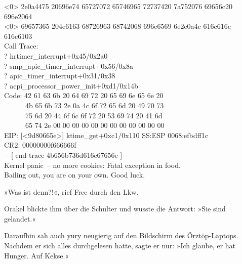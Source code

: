 \begin{tiny}
\begin{ttfamily}
\noindent [376730.313667] \textless{}0\textgreater{} 2e0a4475 20696e74 65727072 65746965 72737420 7a752076 69656c20 696e2064\\
\noindent [376730.313667] \textless{}0\textgreater{} 69657365 204e6163 68726963 68742068 696e6569 6e2e0a4c 616c616c 616c6103\\
\noindent [376730.313667] Call Trace:\\
 ? hrtimer\_interrupt+0x45/0x2a0\\
 ? smp\_apic\_timer\_interrupt+0x56/0x8a\\
\noindent [376730.313667]  [\textless{}44726569\textgreater{}] ? apic\_timer\_interrupt+0x31/0x38\\
\noindent [376730.313667]  [\textless{}56696572\textgreater{}] ? acpi\_processor\_power\_init+0xd1/0x14b\\
\noindent [376730.313667] Code: 42 61 63 6b 20 64 69 72 20 65 69 6e 65 6e 20\\
\noindent [376730.313667] ~~~~~~4b 65 6b 73 2e 0a 4c 6f 72 65 6d 20 49 70 73\\
\noindent [376730.313667] ~~~~~~75 6d 20 44 6f 6c 6f 72 20 53 69 74 20 41 6d\\
\noindent [376730.313667] ~~~~~~65 74 2e 00 00 00 00 00 00 00 00 00 00 00 00\\
\noindent [376730.313667] EIP: [\textless{}9d80665e\textgreater{}] ktime\_get+0xc1/0x110 SS:ESP 0068:efbdff1c\\
\noindent [376730.313667] CR2: 00000000f666666f\\
\noindent [376730.313667] ---[ end trace 4b656b736d616e67656c ]---\\
\noindent [376730.313667] Kernel panic~– no more cookies: Fatal exception in food.\\
\noindent [376730.313667] Bailing out, you are on your own. Good luck.

    \end{ttfamily}
    \end{tiny}

\bigskip

»Was ist  denn?!«, rief Free durch den Lkw.

Orakel blickte ihm über die Schulter und wusste die Antwort: »Sie sind gelandet.«

Daraufhin sah auch yury neugierig auf den Bildschirm des Örztöp-Laptops. Nachdem er sich alles durchgelesen hatte, sagte er nur: »Ich glaube, er hat Hunger. Auf Kekse.«

